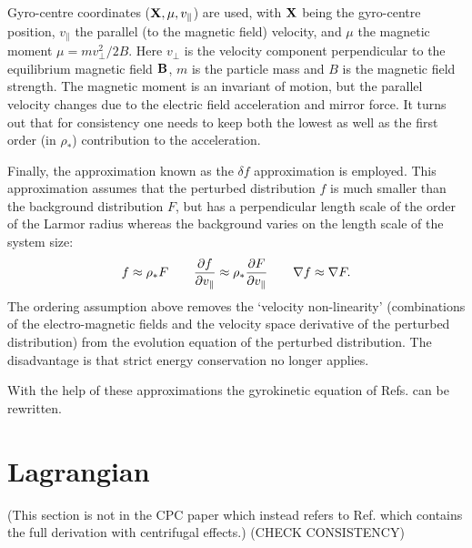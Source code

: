 Gyro-centre coordinates (${\bf X},\mu,v_\parallel$) are used, with ${\bf X}$ being the gyro-centre position, $v_\parallel$ the parallel (to the magnetic field) velocity, and $\mu$ the magnetic moment $\mu = {m v_\perp^2 / 2 B} $.  
Here $v_\perp$ is the velocity component perpendicular to the equilibrium magnetic field ${\bf B}$, $m$
is the particle mass and $B$ is the magnetic field strength. 
The magnetic moment is an invariant of motion, but the parallel velocity changes due to the electric field 
acceleration and mirror force. 
It turns out that for consistency one needs to keep both the lowest as well as the first order (in $\rho_*$) 
contribution to the acceleration. 


Finally, the approximation known as the $\delta f$ approximation is employed. 
This approximation assumes that the perturbed distribution $f$ is much smaller than the background distribution 
$F$, but has a perpendicular length scale of the order of the Larmor radius whereas the background varies 
on the length scale of the system size:
\begin{equation} 
f \approx \rho_* F \qquad 
{\partial f \over \partial v_\parallel} \approx \rho_* {\partial F \over \partial v_\parallel}  \qquad 
\nabla f \approx \nabla F .
\end{equation}
The ordering assumption above removes the `velocity non-linearity' (combinations of the 
electro-magnetic fields and the velocity space derivative of the perturbed distribution) from
the evolution equation of the perturbed distribution. 
The disadvantage is  that strict energy conservation no longer applies.   

With the help of these approximations the gyrokinetic equation of Refs. \cite{LIT83,BRI88,SUG00}
can be rewritten. 

\section{Lagrangian}
\label{sec:theoryLagrangian}
(This section is not in the CPC paper which instead refers to Ref. \cite{PEE09} which contains the full derivation with centrifugal effects.)
(CHECK CONSISTENCY)

